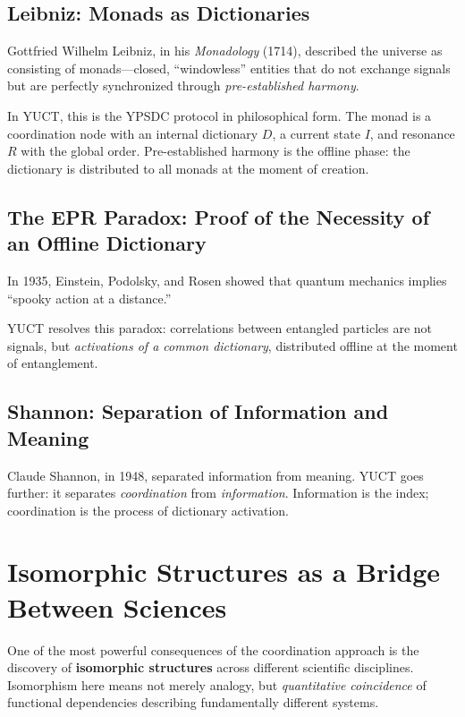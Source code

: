 \documentclass[12pt,a4paper]{article}
\begin{document}
	\subsection{Leibniz: Monads as Dictionaries}
	
	Gottfried Wilhelm Leibniz, in his \emph{Monadology} (1714), described the universe as consisting of monads—closed, ``windowless'' entities that do not exchange signals but are perfectly synchronized through \emph{pre-established harmony}.
	
	In YUCT, this is the YPSDC protocol in philosophical form. The monad is a coordination node with an internal dictionary \(D\), a current state \(I\), and resonance \(R\) with the global order. Pre-established harmony is the offline phase: the dictionary is distributed to all monads at the moment of creation.
	
	\subsection{The EPR Paradox: Proof of the Necessity of an Offline Dictionary}
	
	In 1935, Einstein, Podolsky, and Rosen showed that quantum mechanics implies ``spooky action at a distance.''
	
	YUCT resolves this paradox: correlations between entangled particles are not signals, but \emph{activations of a common dictionary}, distributed offline at the moment of entanglement.
	
	\subsection{Shannon: Separation of Information and Meaning}
	
	Claude Shannon, in 1948, separated information from meaning. YUCT goes further: it separates \emph{coordination} from \emph{information}. Information is the index; coordination is the process of dictionary activation.
	
	\section{Isomorphic Structures as a Bridge Between Sciences}
	\label{sec:isomorphisms}
	
	One of the most powerful consequences of the coordination approach is the discovery of \textbf{isomorphic structures} across different scientific disciplines. Isomorphism here means not merely analogy, but \emph{quantitative coincidence} of functional dependencies describing fundamentally different systems.
	
\end{document}
